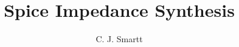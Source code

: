\documentclass{article}
\begin{document}
\title{Spice Impedance Synthesis}
\author{C. J. Smartt}

\maketitle




\clearpage



\clearpage



\clearpage
\end{document}
